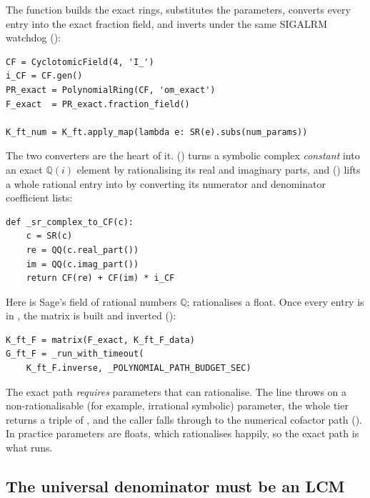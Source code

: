 The function builds the exact rings, substitutes the parameters, converts every
entry into the exact fraction field, and inverts under the same SIGALRM watchdog
():

\begin{lstlisting}
CF = CyclotomicField(4, 'I_')
i_CF = CF.gen()
PR_exact = PolynomialRing(CF, 'om_exact')
F_exact  = PR_exact.fraction_field()

K_ft_num = K_ft.apply_map(lambda e: SR(e).subs(num_params))
\end{lstlisting}

The two converters are the heart of it. 
() turns a symbolic complex \emph{constant}
into an exact $\mathbb{Q}(i)$ element by rationalising its real and imaginary
parts, and  () lifts a
whole rational entry into  by converting its numerator and
denominator coefficient lists:

\begin{lstlisting}
def _sr_complex_to_CF(c):
    c = SR(c)
    re = QQ(c.real_part())
    im = QQ(c.imag_part())
    return CF(re) + CF(im) * i_CF
\end{lstlisting}

Here  is Sage's field of rational numbers $\mathbb{Q}$; 
rationalises a float. Once every entry is in , the matrix is built
and inverted ():

\begin{lstlisting}
K_ft_F = matrix(F_exact, K_ft_F_data)
G_ft_F = _run_with_timeout(
    K_ft_F.inverse, _POLYNOMIAL_PATH_BUDGET_SEC)
\end{lstlisting}

\begin{gotcha}
The exact path \emph{requires} parameters that  can rationalise. The line
 throws on a non-rationalisable (for example,
irrational symbolic) parameter, the whole tier returns a triple of ,
and the caller falls through to the numerical cofactor path
(). In practice parameters are floats, which
 rationalises happily, so the exact path is what runs.
\end{gotcha}

\subsection{The universal denominator must be an LCM}

